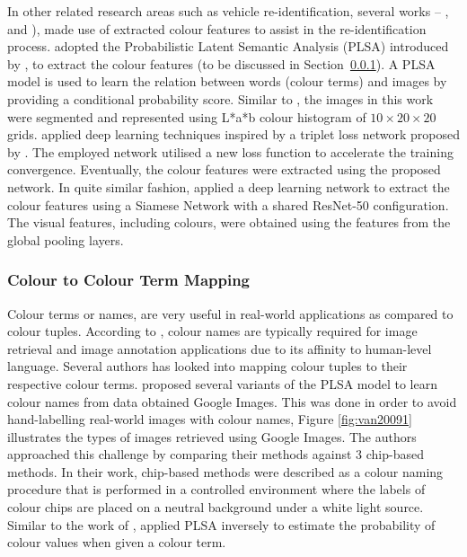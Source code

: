 In other related research areas such as vehicle re-identification, several works -- \cite{liu2016deep}, \cite{liu2016deep2} and \cite{shen2017learning}), made use of extracted colour features to assist in the re-identification process.  adopted the Probabilistic Latent Semantic Analysis (PLSA) introduced by , to extract the colour features (to be discussed in Section~\ref{sec:color2colorterm}). A PLSA model is used to learn the relation between words (colour terms) and images by providing a conditional probability score. Similar to \cite{kim2008deciding}, the images in this work were segmented and represented using L*a*b colour histogram of $10 \times 20 \times 20$ grids.  applied deep learning techniques inspired by a triplet loss network proposed by . The employed network utilised a new loss function to accelerate the training convergence. Eventually, the colour features were extracted using the proposed network. In quite similar fashion,  applied a deep learning network to extract the colour features using a Siamese Network with a shared ResNet-50 configuration. The visual features, including colours, were obtained using the features from the global pooling layers.

\vspace{1em}
\subsubsection{Colour to Colour Term Mapping}
\label{sec:color2colorterm}

Colour terms or names, are very useful in real-world applications as compared to colour tuples. According to \cite{van2009learning}, colour names are typically required for image retrieval and image annotation applications due to its affinity to human-level language. Several authors has looked into mapping colour tuples to their respective colour terms.  proposed several variants of the PLSA model to learn colour names from data obtained Google Images. This was done in order to avoid hand-labelling real-world images with colour names, Figure \ref{fig:van20091} illustrates the types of images retrieved using Google Images. The authors approached this challenge by comparing their methods against 3 chip-based methods. In their work, chip-based methods were described as a colour naming procedure that is performed in a controlled environment where the labels of colour chips are placed on a neutral background under a white light source. Similar to the work of ,  applied PLSA inversely to estimate the probability of colour values when given a colour term.

